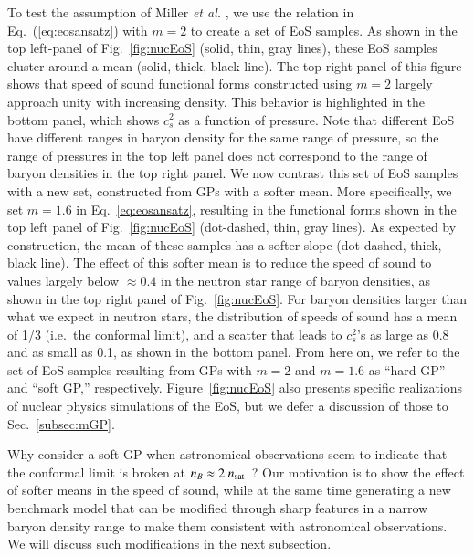 \documentclass[aps,prd,nofootinbib,tightenlines,notitlepage,floatfix,superscriptaddress,showkeys,twocolumn]{revtex4-1}
\begin{document}
To test the assumption of Miller \textit{et al.} \cite{Miller:2021qha}, we use the relation in Eq.\ (\ref{eq:eosansatz}) with $m=2$ to create a set of EoS samples. As shown in the top left-panel of Fig.~\ref{fig:nucEoS} (solid, thin, gray lines), these EoS samples cluster around a mean (solid, thick, black line). The top right panel of this figure shows that speed of sound functional forms constructed using $m=2$ largely approach unity with increasing density. This behavior is highlighted in the bottom panel, which shows $c_s^2$ as a function of pressure. Note that different EoS have different ranges in baryon density for the same range of pressure, so the range of pressures in the top left panel does not correspond to the range of baryon densities in the top right panel. 
We now contrast this set of EoS samples with a new set, constructed from GPs with a softer mean. More specifically, we set $m=1.6$ in Eq.~\eqref{eq:eosansatz}, resulting in the functional forms shown in the top left panel of Fig.~\ref{fig:nucEoS} (dot-dashed, thin, gray lines). As expected by construction, the mean of these samples has a softer slope (dot-dashed, thick, black line). The effect of this softer mean is to reduce the speed of sound to values largely below $\approx 0.4$ in the neutron star range of baryon densities, as shown in the top right panel of Fig.~\ref{fig:nucEoS}. For baryon densities larger than what we expect in neutron stars, the distribution of speeds of sound has a mean of 1/3 (i.e.~the conformal limit), and a scatter that leads to $c_s^2$'s as large as 0.8 and as small as 0.1, as shown in the bottom panel.  From here on, we refer to the set of EoS samples resulting from GPs with $m=2$ and $m=1.6$ as ``hard GP'' and ``soft GP,'' respectively. Figure~\ref{fig:nucEoS} also presents specific realizations of nuclear physics simulations of the EoS, but we defer a discussion of those to Sec.~\ref{subsec:mGP}. 

Why consider a soft GP when astronomical observations seem to indicate that the conformal limit is broken at $n_B \approx 2 \ n_{\rm sat}$~\cite{Fujimoto:2019hxv,Legred:2021hdx,Miller:2021qha,Raaijmakers:2021uju}? Our motivation is to show the effect of softer means in the speed of sound, while at the same time generating a new benchmark model that can be modified through sharp features in a narrow baryon density range to make them consistent with astronomical observations. We will discuss such modifications in the next subsection. 
\end{document}
